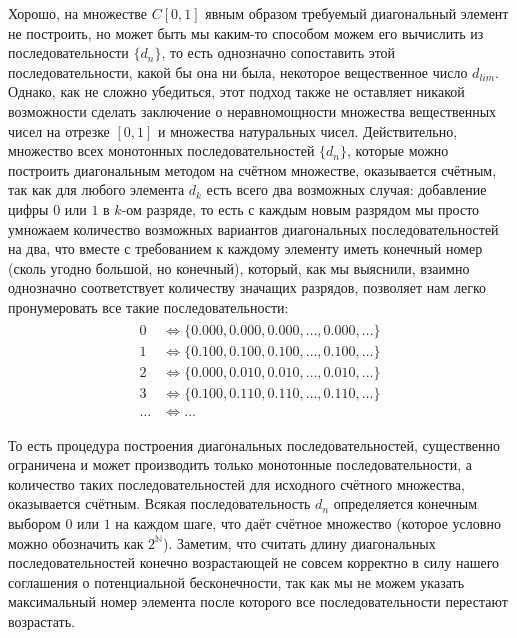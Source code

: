 \documentclass[12pt]{article}
\begin{document}
Хорошо, на множестве $C[0, 1]$ явным образом требуемый диагональный элемент не построить, но может быть мы каким-то способом можем его вычислить из последовательности $\{d_n\}$, то есть однозначно сопоставить этой последовательности, какой бы она ни была, некоторое вещественное число $d_{lim}$. Однако, как не сложно убедиться, этот подход также не оставляет никакой возможности сделать заключение о неравномощности множества вещественных чисел на отрезке $[0, 1]$ и множества натуральных чисел. Действительно, множество всех монотонных последовательностей $\{d_n\}$, которые можно построить диагональным методом на счётном множестве, оказывается счётным, так как для любого элемента $d_k$ есть всего два возможных случая: добавление цифры $0$ или $1$ в $k$-ом разряде, то есть с каждым новым разрядом мы просто умножаем количество возможных вариантов диагональных последовательностей на два, что вместе с требованием к каждому элементу иметь конечный номер (сколь угодно большой, но конечный), который, как мы выяснили, взаимно однозначно соответствует количеству значащих разрядов, позволяет нам легко пронумеровать все такие последовательности:
\begin{align}
\begin{split}
0 &\Leftrightarrow \{0.000, 0.000, 0.000, \dots, 0.000, \dots\}\\
1 &\Leftrightarrow \{0.100, 0.100, 0.100, \dots, 0.100, \dots\}\\
2 &\Leftrightarrow \{0.000, 0.010, 0.010, \dots, 0.010, \dots\}\\
3 &\Leftrightarrow \{0.100, 0.110, 0.110, \dots, 0.110, \dots\}\\
\dots &\Leftrightarrow \dots
\end{split}
\end{align}

То есть процедура построения диагональных последовательностей, существенно ограничена и может производить только монотонные последовательности, а количество таких последовательностей для исходного счётного множества, оказывается счётным. Всякая последовательность ${d_n}$ определяется конечным выбором $0$ или $1$ на каждом шаге, что даёт счётное множество (которое условно можно обозначить как $2^{\mathbb{N}}$). Заметим, что считать длину диагональных последовательностей конечно возрастающей не совсем корректно в силу нашего соглашения о потенциальной бесконечности, так как мы не можем указать максимальный номер элемента после которого все последовательности перестают возрастать.
\end{document}
